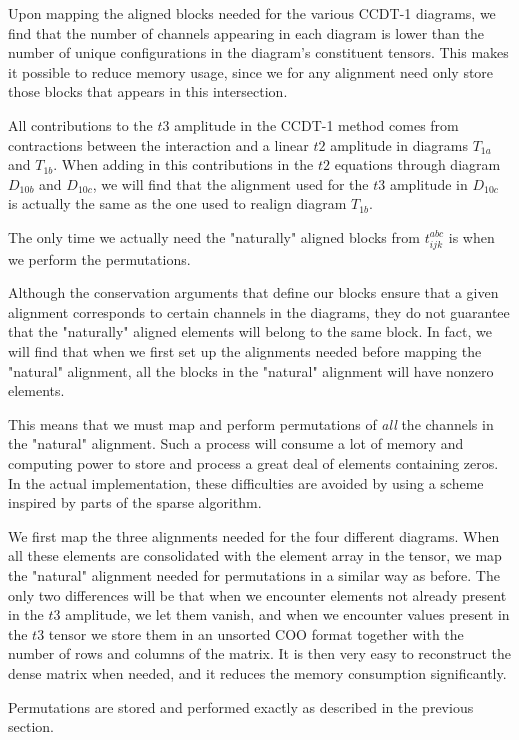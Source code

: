 Upon mapping the aligned blocks needed for the various CCDT-1 diagrams, we find that the number of channels appearing in each diagram is lower than the number of unique configurations in the diagram's constituent tensors. This makes it possible to reduce memory usage, since we for any alignment need only store those blocks that appears in this intersection. 

All contributions to the $t3$ amplitude in the CCDT-1 method comes from contractions between the interaction and a linear $t2$ amplitude in diagrams $T_{1a}$ and $T_{1b}$. When adding in this contributions in the $t2$ equations through diagram $D_{10b}$ and $D_{10c}$, we will find that the alignment used for the $t3$ amplitude in $D_{10c}$ is actually the same as the one used to realign diagram $T_{1b}$. 

The only time we actually need the "naturally" aligned blocks from $t^{abc}_{ijk}$ is when we perform the permutations. 

Although the conservation arguments that define our blocks ensure that a given alignment corresponds to certain channels in the diagrams, they do not guarantee that the "naturally" aligned elements will belong to the same block. In fact, we will find that when we first set up the alignments needed before mapping the "natural" alignment, all the blocks in the "natural" alignment will have nonzero elements.

This means that we must map and perform permutations of \emph{all} the channels in the "natural" alignment. Such a process will consume a lot of memory and computing power to store and process a great deal of elements containing zeros. In the actual implementation, these difficulties are avoided by using a scheme inspired by parts of the sparse algorithm. 

We first map the three alignments needed for the four different diagrams. When all these elements are consolidated with the element array in the tensor, we map the "natural" alignment needed for permutations in a similar way as before. The only two differences will be that when we encounter elements not already present in the $t3$ amplitude, we let them vanish, and when we encounter values present in the $t3$ tensor we store them in an unsorted COO format together with the number of rows and columns of the matrix. It is then very easy to reconstruct the dense matrix when needed, and it reduces the memory consumption significantly.

Permutations are stored and performed exactly as described in the previous section.







